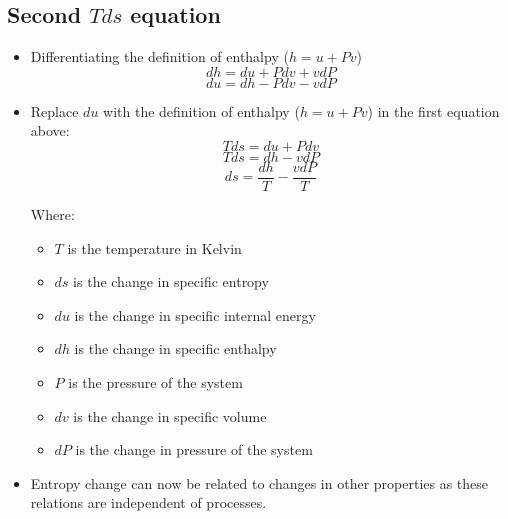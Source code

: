 \documentclass[11pt]{article}
\begin{document}
\subsection{Second \(T ds\) equation}
\label{sec:orgcab7843}
\begin{itemize}
\item Differentiating the definition of enthalpy (\(h = u + Pv\))
\[dh = du + P dv + vdP\]
\[du = dh - P dv - vdP\]

\item Replace \(du\) with the definition of enthalpy (\(h = u + Pv\)) in the first equation above:
\[Tds = du + P dv\]
\[Tds = dh - v dP\]
\[ds = \frac{dh}{T} - \frac{v dP}{T}\]

Where:
\begin{itemize}
\item \(T\) is the temperature in Kelvin
\item \(ds\) is the change in specific entropy
\item \(du\) is the change in specific internal energy
\item \(dh\) is the change in specific enthalpy
\item \(P\) is the pressure of the system
\item \(dv\) is the change in specific volume
\item \(dP\) is the change in pressure of the system
\end{itemize}

\item Entropy change can now be related to changes in other properties as these relations are independent of processes.
\end{itemize}

 \newpage
\end{document}
